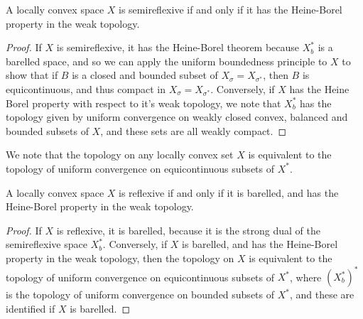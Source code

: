 \begin{theorem}
    A locally convex space $X$ is semireflexive if and only if it has the Heine-Borel property in the weak topology.
\end{theorem}
\begin{proof}
    If $X$ is semireflexive, it has the Heine-Borel theorem because $X^*_b$ is a barelled space, and so we can apply the uniform boundedness principle to $X$ to show that if $B$ is a closed and bounded subset of $X_\sigma = X_{\sigma^*}$, then $B$ is equicontinuous, and thus compact in $X_\sigma = X_{\sigma^*}$. Conversely, if $X$ has the Heine Borel property with respect to it's weak topology, we note that $X^*_b$ has the topology given by uniform convergence on weakly closed convex, balanced and bounded subsets of $X$, and these sets are all weakly compact.
\end{proof}

We note that the topology on any locally convex set $X$ is equivalent to the topology of uniform convergence on equicontinuous subsets of $X^*$.

\begin{theorem}
    A locally convex space $X$ is reflexive if and only if it is barelled, and has the Heine-Borel property in the weak topology.
\end{theorem}
\begin{proof}
    If $X$ is reflexive, it is barelled, because it is the strong dual of the semireflexive space $X^*_b$. Conversely, if $X$ is barelled, and has the Heine-Borel property in the weak topology, then the topology on $X$ is equivalent to the topology of uniform convergence on equicontinuous subsets of $X^*$, where $(X^*_b)^*$ is the topology of uniform convergence on bounded subsets of $X^*$, and these are identified if $X$ is barelled.
\end{proof}

